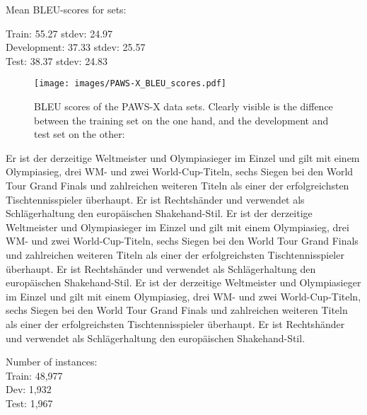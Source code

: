 Mean BLEU-scores for sets:

Train: 55.27 stdev: 24.97\\
Development: 37.33 stdev: 25.57\\
Test: 38.37 stdev: 24.83

\begin{wrapfigure}{r}{0.45\linewidth}
  \begin{center}
    \texttt{[image: images/PAWS-X\_BLEU\_scores.pdf]}
  \end{center}
  \caption[PAWS-X BLEU]{BLEU scores of the PAWS-X data sets. Clearly visible is the diffence between the training set on the one hand,
                      and the development and test set on the other:}
\end{wrapfigure}



Er ist der derzeitige Weltmeister und Olympiasieger im Einzel und gilt mit einem Olympiasieg, drei WM- und zwei
World-Cup-Titeln, sechs Siegen bei den World Tour Grand Finals und zahlreichen weiteren Titeln als
einer der erfolgreichsten Tischtennisspieler überhaupt. Er ist Rechtshänder und verwendet als Schlägerhaltung den europäischen Shakehand-Stil.
Er ist der derzeitige Weltmeister und Olympiasieger im Einzel und gilt mit einem Olympiasieg, drei WM- und zwei
World-Cup-Titeln, sechs Siegen bei den World Tour Grand Finals und zahlreichen weiteren Titeln als
einer der erfolgreichsten Tischtennisspieler überhaupt. Er ist Rechtshänder und verwendet als Schlägerhaltung den europäischen Shakehand-Stil.
Er ist der derzeitige Weltmeister und Olympiasieger im Einzel und gilt mit einem Olympiasieg, drei WM- und zwei
World-Cup-Titeln, sechs Siegen bei den World Tour Grand Finals und zahlreichen weiteren Titeln als
einer der erfolgreichsten Tischtennisspieler überhaupt. Er ist Rechtshänder und verwendet als Schlägerhaltung den europäischen Shakehand-Stil.




Number of instances: \\
Train: 48,977 \\
Dev: 1,932 \\
Test: 1,967


